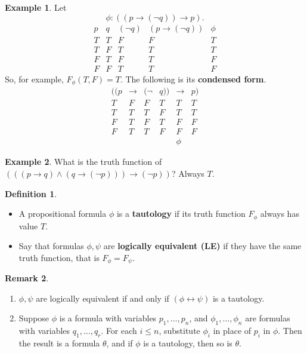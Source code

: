 \documentclass{article}
\newcommand{\rb}[1]{\left( #1 \right)}
\newcommand{\notb}[1]{\rb{\neg #1}}
\newcommand{\andb}[2]{\rb{#1 \land #2}}
\newcommand{\impb}[2]{\rb{#1 \rightarrow #2}}
\newcommand{\iffb}[2]{\rb{#1 \leftrightarrow #2}}
\theoremstyle{definition}\newtheorem{definition}{Definition}[subsection]
\theoremstyle{definition}\newtheorem{remark1}[definition]{Remark}
\theoremstyle{definition}\newtheorem{example1}[definition]{Example}
\theoremstyle{definition}\newtheorem*{remark2}{Remark}
\theoremstyle{definition}\newtheorem*{example2}{Example}
\theoremstyle{definition}\newtheorem*{note}{Note}
\theoremstyle{definition}\newtheorem*{notation}{Notation}
\begin{document}
\begin{example2}
Let
$$ \phi : \impb{\impb{p}{\notb{q}}}{p}. $$
$$
\begin{array}{cc|ccc}
p & q & \notb{q} & \impb{p}{\notb{q}} & \phi \\
\hline
T & T & F & F & T \\
T & F & T & T & T \\
F & T & F & T & F \\
F & F & T & T & F
\end{array}
$$
So, for example, $ F_\phi\rb{T, F} = T $. The following is its \textbf{condensed form}.
$$
\begin{array}{rcrlcl}
((p & \rightarrow & (\neg & q)) & \rightarrow & p) \\
\hline
T & F & F & T & T & T \\
T & T & T & F & T & T \\
F & T & F & T & F & F \\
F & T & T & F & F & F \\
& & & & \phi &
\end{array}
$$
\end{example2}


\begin{example2}
What is the truth function of $ \impb{\andb{\impb{p}{q}}{\impb{q}{\notb{p}}}}{\notb{p}} $? Always $ T $.
\end{example2}

\begin{definition}
\hfill
\begin{itemize}
\item A propositional formula $ \phi $ is a \textbf{tautology} if its truth function $ F_\phi $ always has value $ T $.
\item Say that formulas $ \phi, \psi $ are \textbf{logically equivalent (LE)} if they have the same truth function, that is $ F_\phi = F_\psi $.
\end{itemize}
\end{definition}

\begin{remark1}
\label{rem:1.1.5}
\hfill
\begin{enumerate}
\item $ \phi, \psi $ are logically equivalent if and only if $ \iffb{\phi}{\psi} $ is a tautology.
\item Suppose $ \phi $ is a formula with variables $ p_1, \dots, p_n $, and $ \phi_1, \dots, \phi_n $ are formulas with variables $ q_1, \dots, q_r $. For each $ i \le n $, substitute $ \phi_i $ in place of $ p_i $ in $ \phi $. Then the result is a formula $ \theta $, and if $ \phi $ is a tautology, then so is $ \theta $.
\end{enumerate}
\end{remark1}
\end{document}
